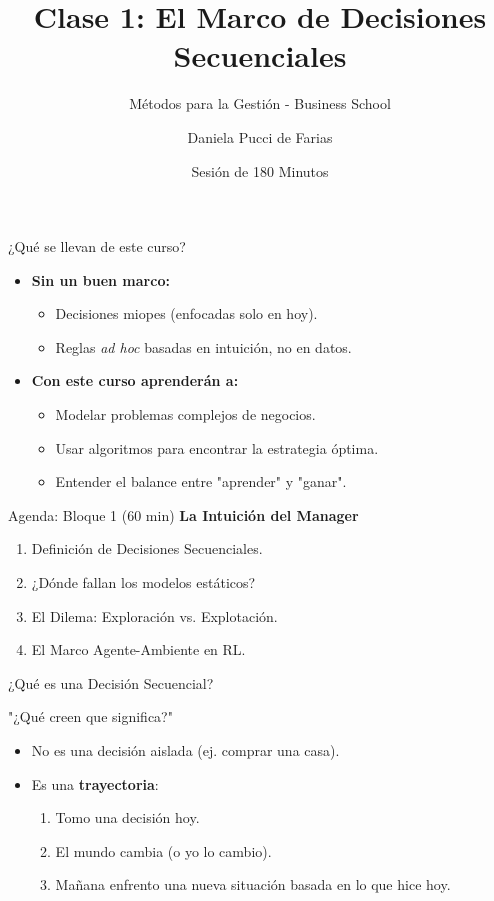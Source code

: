 \documentclass{beamer}
\title{Clase 1: El Marco de Decisiones Secuenciales}
\subtitle{Métodos para la Gestión - Business School}
\author{Daniela Pucci de Farias}
\institute{Universidad Torcuato Di Tella}
\date{Sesión de 180 Minutos}
\begin{document}
\frame{\titlepage}

\begin{frame}{¿Qué se llevan de este curso?}
\begin{itemize}
    \item \textbf{Sin un buen marco:}
    \begin{itemize}
        \item Decisiones miopes (enfocadas solo en hoy).
        \item Reglas \textit{ad hoc} basadas en intuición, no en datos.
    \end{itemize}
    \vspace{0.3cm}
    \item \textbf{Con este curso aprenderán a:}
    \begin{itemize}
        \item Modelar problemas complejos de negocios.
        \item Usar algoritmos para encontrar la estrategia óptima.
        \item Entender el balance entre "aprender" y "ganar".
    \end{itemize}
\end{itemize}
\end{frame}

\begin{frame}{Agenda: Bloque 1 (60 min)}
\textbf{La Intuición del Manager}
\begin{enumerate}
    \item Definición de Decisiones Secuenciales.
    \item ¿Dónde fallan los modelos estáticos?
    \item El Dilema: Exploración vs. Explotación.
    \item El Marco Agente-Ambiente en RL.
\end{enumerate}
\end{frame}

\begin{frame}{¿Qué es una Decisión Secuencial?}
\begin{center}
    \Large "¿Qué creen que significa?"
\end{center}
\pause
\begin{itemize}
    \item No es una decisión aislada (ej. comprar una casa).
    \item Es una \textbf{trayectoria}:
    \begin{enumerate}
        \item Tomo una decisión hoy.
        \item El mundo cambia (o yo lo cambio).
        \item Mañana enfrento una nueva situación basada en lo que hice hoy.
    \end{enumerate}
\end{itemize}
\end{frame}
\end{document}
